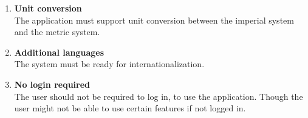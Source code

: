 \begin{enumerate}
  \item\label{req:unitconversion} \textbf{Unit conversion} \\
    The application must support unit conversion between the imperial system and the metric system.
    
  \item\label{req:additionallanguages} \textbf{Additional languages} \\
    The system must be ready for internationalization.
  
  \item\label{req:Nologinrequired} \textbf{No login required} \\
    The user should not be required to log in, to use the application. Though the user might not be able to use certain features if not logged in.
\end{enumerate}